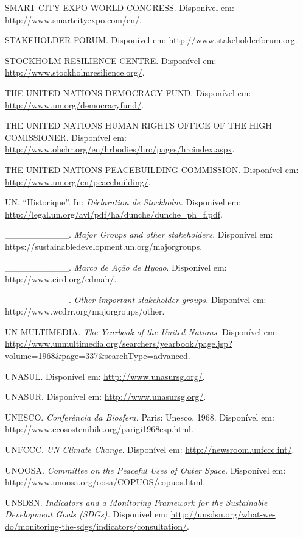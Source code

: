 SMART CITY EXPO WORLD CONGRESS. Disponível em:
\url{http://www.smartcityexpo.com/en/}.

STAKEHOLDER FORUM. Disponível em: \url{http://www.stakeholderforum.org}.

STOCKHOLM RESILIENCE CENTRE. Disponível em:
\url{http://www.stockholmresilience.org/}.

THE UNITED NATIONS DEMOCRACY FUND. Disponível em:
\url{http://www.un.org/democracyfund/}.

THE UNITED NATIONS HUMAN RIGHTS OFFICE OF THE HIGH COMISSIONER.
Disponível em:
\url{http://www.ohchr.org/en/hrbodies/hrc/pages/hrcindex.aspx}.

THE UNITED NATIONS PEACEBUILDING COMMISSION. Disponível em:
\url{http://www.un.org/en/peacebuilding/}.

UN. ``Historique''. In: \emph{Déclaration de Stockholm.} Disponível em:
\url{http://legal.un.org/avl/pdf/ha/dunche/dunche_ph_f.pdf}.

\_\_\_\_\_\_\_\_\_\_. \emph{Major Groups and other stakeholders}.
Disponível em: \url{https://sustainabledevelopment.un.org/majorgroups}.

\_\_\_\_\_\_\_\_\_\_. \emph{Marco de Ação de Hyogo}. Disponível em:
\url{http://www.eird.org/cdmah/}.

\_\_\_\_\_\_\_\_\_\_. \emph{Other important stakeholder groups.}
Disponível em: http://www.wcdrr.org/majorgroups/other.

UN MULTIMEDIA. \emph{The Yearbook of the United Nations}. Disponível em:
\url{http://www.unmultimedia.org/searchers/yearbook/page.jsp?volume=1968\&page=337\&searchType=advanced}.

UNASUL. Disponível em:
\href{http://www.unasursg.org/}{{http://www.unasursg.org/}}.

UNASUR. Disponível em: \url{http://www.unasursg.org/}.

UNESCO. \emph{Conferência da Biosfera.} Paris: Unesco, 1968. Disponível
em: \url{http://www.ecosostenibile.org/parigi1968esp.html}.

UNFCCC. \emph{UN Climate Change.} Disponível em:
\url{http://newsroom.unfccc.int/}.

UNOOSA. \emph{Committee on the Peaceful Uses of Outer Space.} Disponível
em: \url{http://www.unoosa.org/oosa/COPUOS/copuos.html}.

UNSDSN. \emph{Indicators and a Monitoring Framework for the Sustainable
Development Goals (SDGs).} Disponível em:
\url{http://unsdsn.org/what-we-do/monitoring-the-sdgs/indicators/consultation/}.

